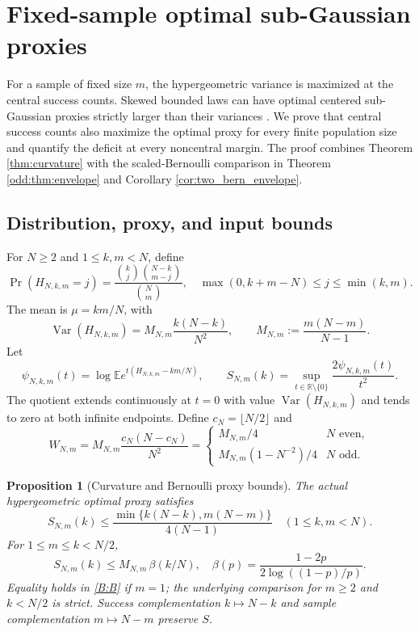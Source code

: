 \documentclass[11pt,a4paper]{article}
\newtheorem{proposition}[theorem]{Proposition}
\DeclareMathOperator{\Var}{Var}\DeclareMathOperator{\Cov}{Cov}\DeclareMathOperator{\Hyp}{Hyp}\DeclareMathOperator{\Bern}{Bern}\DeclareMathOperator{\supp}{supp}\DeclareMathOperator{\artanh}{artanh}
\newcommand{\E}{\mathbb E}\newcommand{\R}{\mathbb R}\newcommand{\N}{\mathbb N}\newcommand{\one}{\mathbf1}
\begin{document}
\section{Fixed-sample optimal sub-Gaussian proxies}\label{sec:fixedsample}
For a sample of fixed size $m$, the hypergeometric variance is maximized at the central success counts. Skewed bounded laws can have optimal centered sub-Gaussian proxies strictly larger than their variances \cite{ArbelMarchalNguyen}. We prove that central success counts also maximize the optimal proxy for every finite population size and quantify the deficit at every noncentral margin. The proof combines Theorem \ref{thm:curvature} with the scaled-Bernoulli comparison in Theorem \ref{odd:thm:envelope} and Corollary \ref{cor:two_bern_envelope}.

\subsection{Distribution, proxy, and input bounds}
For $N\ge2$ and $1\le k,m<N$, define
\begin{equation}\label{B:pmf}
\Pr(H_{N,k,m}=j)=
 \frac{\binom{k}{j}\binom{N-k}{m-j}}{\binom{N}{m}},
 \quad \max(0,k+m-N)\le j\le\min(k,m).
\end{equation}
The mean is $\mu=km/N$, with
\begin{equation}\label{B:variance}
\Var(H_{N,k,m})=
M_{N,m}\frac{k(N-k)}{N^2},\qquad
M_{N,m}:=\frac{m(N-m)}{N-1}.
\end{equation}
Let
\begin{equation}\label{B:proxy}
\psi_{N,k,m}(t)=\log\E e^{t(H_{N,k,m}-km/N)},\qquad
S_{N,m}(k)=\sup_{t\in\mathbb R\setminus\{0\}}
 \frac{2\psi_{N,k,m}(t)}{t^2}.
\end{equation}
The quotient extends continuously at $t=0$ with value
$\Var(H_{N,k,m})$ and tends to zero at both infinite endpoints.
Define $c_N=\lfloor N/2\rfloor$ and
\begin{equation}\label{B:W}
W_{N,m}=M_{N,m}\frac{c_N(N-c_N)}{N^2}
=\begin{cases}M_{N,m}/4&N\text{ even},\\
 M_{N,m}(1-N^{-2})/4&N\text{ odd}.
\end{cases}
\end{equation}

\begin{proposition}[Curvature and Bernoulli proxy bounds]\label{B:inputs}
The actual hypergeometric optimal proxy satisfies
\begin{equation}\label{B:C}
S_{N,m}(k)\le
\frac{\min\{k(N-k),m(N-m)\}}{4(N-1)}
\quad (1\le k,m<N).
\end{equation}
For $1\le m\le k<N/2$,
\begin{equation}\label{B:B}
S_{N,m}(k)\le M_{N,m}\,\beta(k/N),\quad
\beta(p)=\frac{1-2p}{2\log((1-p)/p)}.
\end{equation}
Equality holds in \eqref{B:B} if $m=1$; the underlying comparison
for $m\ge2$ and $k<N/2$ is strict. Success complementation $k\mapsto N-k$
and sample complementation $m\mapsto N-m$ preserve $S$.
\end{proposition}
\end{document}
